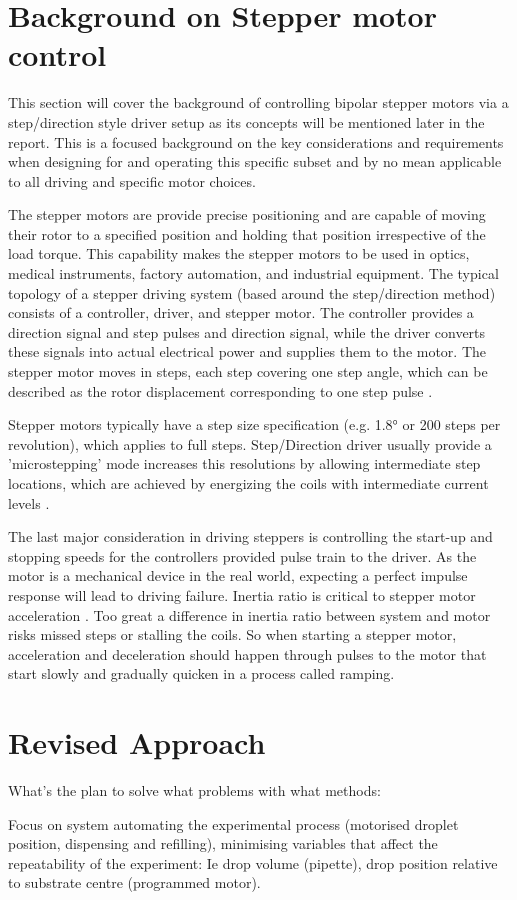 \newpage
\section{Background on Stepper motor control}
This section will cover the background of controlling bipolar stepper motors via a step/direction style driver setup as its concepts will be mentioned later in the report. This is a focused background on the key considerations and requirements when designing for and operating this specific subset and by no mean applicable to all driving and specific motor choices.

The stepper motors are provide precise positioning and are capable of moving their rotor to a specified position and holding that position irrespective of the load torque. This capability makes the stepper motors to be used in optics, medical instruments, factory automation, and industrial equipment. The typical topology of a stepper driving system (based around the step/direction method) consists of a controller, driver, and stepper motor. The controller provides a direction signal and step pulses and direction signal, while the driver converts these signals into actual electrical power and supplies them to the motor. The stepper motor moves in steps, each step covering one step angle, which can be described as the rotor displacement corresponding to one step pulse \cite{step_app}.

Stepper motors typically have a step size specification (e.g. 1.8° or 200 steps per revolution), which applies to full steps. Step/Direction driver usually provide a 'microstepping' mode increases this resolutions by allowing intermediate step locations, which are achieved by energizing the coils with intermediate current levels \cite{step_book}.

The last major consideration in driving steppers is controlling the start-up and stopping speeds for the controllers provided pulse train to the driver. As the motor is a mechanical device in the real world, expecting a perfect impulse response will lead to driving failure. Inertia ratio is critical to stepper motor acceleration \cite{step_book}. Too great a difference in inertia ratio between system and motor risks missed steps or stalling the coils. So when starting a stepper motor, acceleration and deceleration should happen through pulses to the motor that start slowly and gradually quicken in a process called ramping.

\section{Revised Approach}
What's the plan to solve what problems with what methods:

Focus on system automating the experimental process (motorised droplet position, dispensing and refilling), minimising variables that affect the repeatability of the experiment: Ie drop volume (pipette), drop position relative to substrate centre (programmed motor).